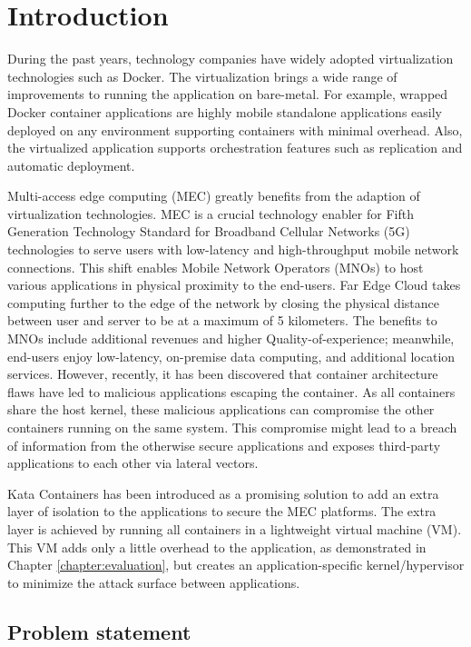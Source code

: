 \chapter{Introduction}
\label{chapter:intro}

During the past years, technology companies have widely adopted virtualization technologies such as Docker. The virtualization brings a wide range of improvements to running the application on bare-metal. For example, wrapped Docker container applications are highly mobile standalone applications easily deployed on any environment supporting containers with minimal overhead. Also, the virtualized application supports orchestration features such as replication and automatic deployment.

Multi-access edge computing (MEC) greatly benefits from the adaption of virtualization technologies. MEC is a crucial technology enabler for Fifth Generation Technology Standard for Broadband Cellular Networks (5G) technologies to serve users with low-latency and high-throughput mobile network connections. This shift enables Mobile Network Operators (MNOs) to host various applications in physical proximity to the end-users. Far Edge Cloud takes computing further to the edge of the network by closing the physical distance between  user and server to be at a maximum of 5 kilometers. The benefits to MNOs include additional revenues and higher Quality-of-experience; meanwhile, end-users enjoy low-latency, on-premise data computing, and additional location services. However, recently, it has been discovered that container architecture flaws have led to malicious applications escaping the container. As all containers share the host kernel, these malicious applications can compromise the other containers running on the same system. This compromise might lead to a breach of information from the otherwise secure applications and exposes third-party applications to each other via lateral vectors.

Kata Containers \cite{KataContainers} has been introduced as a promising solution to add an extra layer of isolation to the applications to secure the MEC platforms. The extra layer is achieved by running all containers in a lightweight virtual machine (VM). This VM adds only a little overhead to the application, as demonstrated in Chapter \ref{chapter:evaluation}, but creates an application-specific kernel/hypervisor to minimize the attack surface between applications.

\section{Problem statement}
\label{section:intro_problemstatement}

